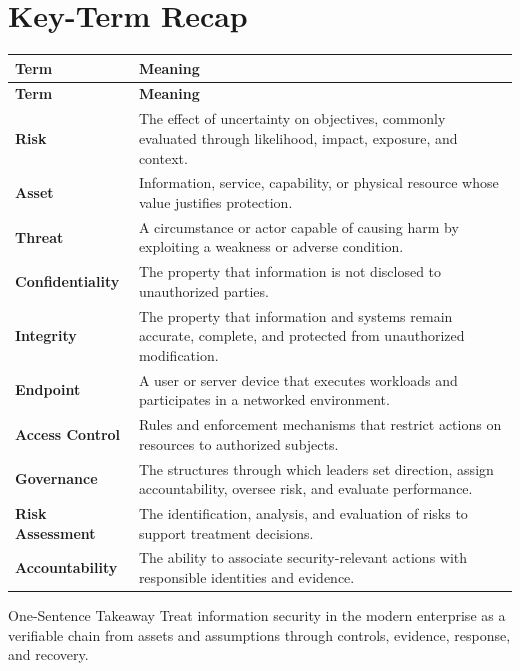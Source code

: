 \documentclass[11pt,letterpaper]{article}
\begin{document}
\section*{Key-Term Recap}
\begin{longtable}{>{\raggedright\arraybackslash}p{}>{\raggedright\arraybackslash}p{}}
\toprule\rowcolor{Navy}\color{white}\textbf{Term} & \color{white}\textbf{Meaning}\\\midrule
\endfirsthead
\toprule\rowcolor{Navy}\color{white}\textbf{Term} & \color{white}\textbf{Meaning}\\\midrule
\endhead
\textbf{Risk} & The effect of uncertainty on objectives, commonly evaluated through likelihood, impact, exposure, and context. \\\midrule
\textbf{Asset} & Information, service, capability, or physical resource whose value justifies protection. \\\midrule
\textbf{Threat} & A circumstance or actor capable of causing harm by exploiting a weakness or adverse condition. \\\midrule
\textbf{Confidentiality} & The property that information is not disclosed to unauthorized parties. \\\midrule
\textbf{Integrity} & The property that information and systems remain accurate, complete, and protected from unauthorized modification. \\\midrule
\textbf{Endpoint} & A user or server device that executes workloads and participates in a networked environment. \\\midrule
\textbf{Access Control} & Rules and enforcement mechanisms that restrict actions on resources to authorized subjects. \\\midrule
\textbf{Governance} & The structures through which leaders set direction, assign accountability, oversee risk, and evaluate performance. \\\midrule
\textbf{Risk Assessment} & The identification, analysis, and evaluation of risks to support treatment decisions. \\\midrule
\textbf{Accountability} & The ability to associate security-relevant actions with responsible identities and evidence. \\\midrule
\bottomrule
\end{longtable}
\begin{CornellExamBox}{One-Sentence Takeaway}
Treat information security in the modern enterprise as a verifiable chain from assets and assumptions through controls, evidence, response, and recovery.
\end{CornellExamBox}
\end{document}
